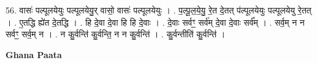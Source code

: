 \documentclass[17pt]{extarticle}
\begin{document}
56. वासः॑ पल्पूलयेयुः पल्पूलयेयु॒र् वासो॒ वासः॑ पल्पूलयेयुः । . प॒ल्पू॒ल॒ये॒यु॒ रे॒त दे॒तत् प॑ल्पूलयेयुः पल्पूलयेयु रे॒तत् । . ए॒तद्धि ह्ये॑त दे॒तद्धि । . हि दे॒वा दे॒वा हि हि दे॒वाः । . दे॒वाः सर्वꣳ॒॒ सर्व॑म् दे॒वा दे॒वाः सर्व᳚म् । . सर्व॒म् न न सर्वꣳ॒॒ सर्व॒म् न । . न कु॒र्वन्ति॑ कु॒र्वन्ति॒ न न कु॒र्वन्ति॑ । . कु॒र्वन्तीति॑ कु॒र्वन्ति॑ । \newline

\textbf{Ghana Paata } \newline
\end{document}
